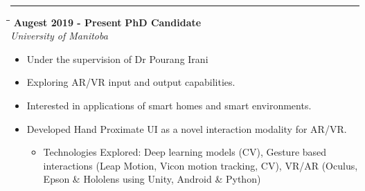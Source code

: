\documentclass[a4paper,11pt]{article}
\begin{document}
\vspace{15pt}
\noindent\textbf{\large{}}
\vspace{-8pt}\noindent\\\rule{0.75\textwidth}{0.4pt}
\vspace{-8pt}
\begin{tabbing}
  \=\hspace*{6cm}\=\hspace*{5cm}\= \kill
  \>\textbf{\large \textbar{}}\textbf{ Augest 2019 - Present} \> \textbf{PhD Candidate}\\\>\> \emph{University of Manitoba}
\end{tabbing}
\vspace{-8pt}
\begin{itemize}
  \setlength\itemsep{0pt}
\item Under the supervision of Dr Pourang Irani
\item Exploring AR/VR input and output capabilities.
\item Interested in applications of smart homes and smart environments.
\item Developed Hand Proximate UI as a novel interaction modality for AR/VR.
  \vspace{-8pt}
  \begin{itemize}
  \item Technologies Explored: Deep learning models (CV), Gesture based interactions (Leap Motion, Vicon motion tracking, CV), VR/AR (Oculus, Epson \& Hololens using Unity, Android \& Python)
  \end{itemize}
\end{itemize}
\end{document}

